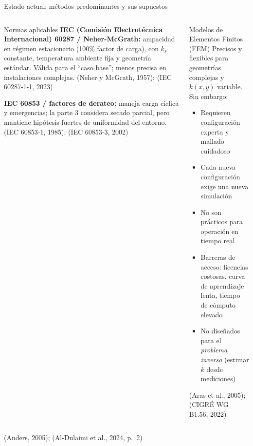 \documentclass[aspectratio=169]{beamer}
\newcommand{\refcite}[1]{{\footnotesize\color{gray!70!black} #1}}
\begin{document}
\begin{frame}{Estado actual: métodos predominantes y sus supuestos}
\begin{columns}[T]
\begin{alertblock}{Normas aplicables}
\scriptsize\justifying
\textbf{IEC (Comisión Electrotécnica Internacional) 60287 / Neher-McGrath:} ampacidad en régimen
estacionario (100\% factor de carga), con $k_s$ constante, temperatura
ambiente fija y geometría estándar. Válida para el ``caso base''; menos precisa en instalaciones complejas.
\refcite{(Neher y McGrath, 1957); (IEC 60287-1-1, 2023)}

\vspace{0.2em}
\textbf{IEC 60853 / factores de derateo:} maneja carga cíclica y
emergencias; la parte 3 considera secado parcial, pero mantiene hipótesis
fuertes de uniformidad del entorno.
\refcite{(IEC 60853-1, 1985); (IEC 60853-3, 2002)}
\end{alertblock}

\begin{alertblock}{Modelos de Elementos Finitos (FEM)}
\scriptsize\justifying
Precisos y flexibles para geometrías complejas y $k(x,y)$ variable. Sin
embargo:
\begin{itemize}[leftmargin=*,itemsep=1pt]
    \item Requieren configuración experta y mallado cuidadoso
    \item Cada nueva configuración exige una nueva simulación
    \item No son prácticos para operación en tiempo real
    \item Barreras de acceso: licencias costosas, curva de aprendizaje
          lenta, tiempo de cómputo elevado
    \item No diseñados para el \textit{problema inverso} (estimar
          $k$ desde mediciones)
\end{itemize}
\refcite{(Aras et al., 2005); (CIGRÉ WG B1.56, 2022)}
\end{alertblock}
\end{columns}

\vspace{0.2em}
\refcite{(Anders, 2005); (Al-Dulaimi et al., 2024, p.~2)}
\end{frame}
\end{document}
